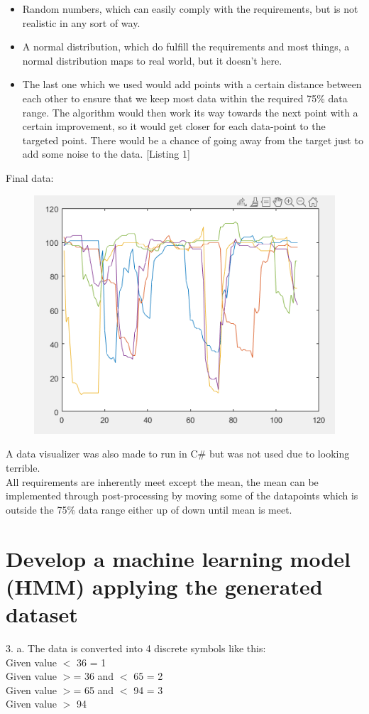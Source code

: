 \begin{itemize}
	\item Random numbers, which can easily comply with the requirements, but is not realistic in any sort of way.
	\item A normal distribution, which do fulfill the requirements and most things, a normal distribution maps to real world, but it doesn't here.
	\item The last one which we used would add points with a certain distance between each other to ensure that we keep most data within the required 75\% data range. The algorithm would then work its way towards the next point with a certain improvement, so it would get closer for each data-point to the targeted point. There would be a chance of going away from the target just to add some noise to the data. [Listing 1]
\end{itemize}

Final data:
\begin{figure}[!h]
	\begin{center}
		\includegraphics[width=.8\textwidth]{rawData}
	\end{center}
\end{figure}

A data visualizer was also made to run in C\# but was not used due to looking terrible.\\
All requirements are inherently meet except the mean, the mean can be implemented through post-processing by moving some of the datapoints which is outside the 75\% data range either up of down until mean is meet.

\newpage
\section{Develop a machine learning model (HMM) applying the generated dataset}
3.
a. The data is converted into 4 discrete symbols like this:\\
Given value $<$ 36 = 1\\
Given value $>$= 36 and $<$ 65 = 2\\
Given value $>$= 65 and $<$ 94 = 3\\
Given value $>$ 94\\

